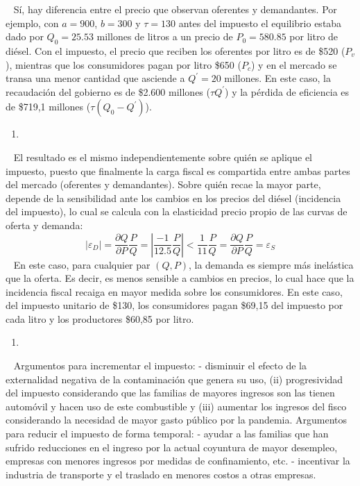 \documentclass[
  letterpaper,
  DIV=11,
  numbers=noendperiod]{scrreport}
\providecommand{\tightlist}{%
  \setlength{\itemsep}{0pt}\setlength{\parskip}{0pt}}\usepackage{longtable,booktabs,array}
\begin{document}
~ Sí, hay diferencia entre el precio que observan oferentes y
demandantes. Por ejemplo, con \(a=900\), \(b=300\) y \(\tau=130\) antes
del impuesto el equilibrio estaba dado por \(Q_0=25.53\) millones de
litros a un precio de \(P_0=580.85\) por litro de diésel. Con el
impuesto, el precio que reciben los oferentes por litro es de \$520
(\(P_v\)), mientras que los consumidores pagan por litro \$650 (\(P_c\))
y en el mercado se transa una menor cantidad que asciende a
\(Q^\prime = 20\) millones. En este caso, la recaudación del gobierno es
de \$2.600 millones (\(\tau Q^\prime\)) y la pérdida de eficiencia es de
\$719,1 millones (\(\tau (Q_0-Q^\prime)\)).

\begin{enumerate}
\def\labelenumi{\alph{enumi})}
\setcounter{enumi}{2}
\tightlist
\item
\end{enumerate}

~ El resultado es el mismo independientemente sobre quién se aplique el
impuesto, puesto que finalmente la carga fiscal es compartida entre
ambas partes del mercado (oferentes y demandantes). Sobre quién recae la
mayor parte, depende de la sensibilidad ante los cambios en los precios
del diésel (incidencia del impuesto), lo cual se calcula con la
elasticidad precio propio de las curvas de oferta y demanda:
\[|\varepsilon_D | =\frac{\partial Q}{\partial P} \frac{P}{Q}=|\frac{-1}{12.5} \frac{P}{Q}| < \frac{1}{11} \frac{P}{Q}=\frac{\partial Q}{\partial P} \frac{P}{Q}=\varepsilon_S\]
~ En este caso, para cualquier par \((Q, P)\), la demanda es siempre más
inelástica que la oferta. Es decir, es menos sensible a cambios en
precios, lo cual hace que la incidencia fiscal recaiga en mayor medida
sobre los consumidores. En este caso, del impuesto unitario de \$130,
los consumidores pagan \$69,15 del impuesto por cada litro y los
productores \$60,85 por litro.

\begin{enumerate}
\def\labelenumi{\alph{enumi})}
\setcounter{enumi}{3}
\tightlist
\item
\end{enumerate}

~ Argumentos para incrementar el impuesto: - disminuir el efecto de la
externalidad negativa de la contaminación que genera su uso, (ii)
progresividad del impuesto considerando que las familias de mayores
ingresos son las tienen automóvil y hacen uso de este combustible y
(iii) aumentar los ingresos del fisco considerando la necesidad de mayor
gasto público por la pandemia. Argumentos para reducir el impuesto de
forma temporal: - ayudar a las familias que han sufrido reducciones en
el ingreso por la actual coyuntura de mayor desempleo, empresas con
menores ingresos por medidas de confinamiento, etc. - incentivar la
industria de transporte y el traslado en menores costos a otras
empresas.
\end{document}
